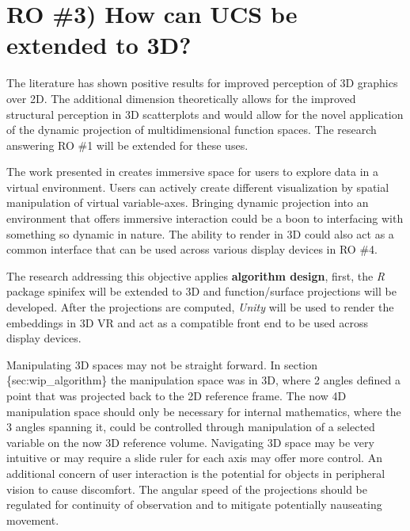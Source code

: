 \documentclass{monashthesis}
\begin{document}
\hypertarget{ro-3-how-can-ucs-be-extended-to-3d}{%
\section{RO \#3) How can UCS be extended to 3D?}\label{ro-3-how-can-ucs-be-extended-to-3d}}

The literature has shown positive results for improved perception of 3D graphics over 2D. The additional dimension theoretically allows for the improved structural perception in 3D scatterplots and would allow for the novel application of the dynamic projection of multidimensional function spaces. The research answering RO \#1 will be extended for these uses.

The work presented in \textcite{cordeil_imaxes:_2017} creates immersive space for users to explore data in a virtual environment. Users can actively create different visualization by spatial manipulation of virtual variable-axes. Bringing dynamic projection into an environment that offers immersive interaction could be a boon to interfacing with something so dynamic in nature. The ability to render in 3D could also act as a common interface that can be used across various display devices in RO \#4.

The research addressing this objective applies \textbf{algorithm design}, first, the \emph{R} package spinifex will be extended to 3D and function/surface projections will be developed. After the projections are computed, \emph{Unity} will be used to render the embeddings in 3D VR and act as a compatible front end to be used across display devices.

Manipulating 3D spaces may not be straight forward. In section \{sec:wip\_algorithm\} the manipulation space was in 3D, where 2 angles defined a point that was projected back to the 2D reference frame. The now 4D manipulation space should only be necessary for internal mathematics, where the 3 angles spanning it, could be controlled through manipulation of a selected variable on the now 3D reference volume. Navigating 3D space may be very intuitive or may require a slide ruler for each axis may offer more control. An additional concern of user interaction is the potential for objects in peripheral vision to cause discomfort. The angular speed of the projections should be regulated for continuity of observation and to mitigate potentially nauseating movement.
\end{document}
